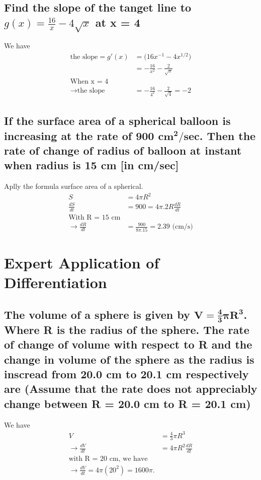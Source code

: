 \documentclass{article}
\begin{document}
\begin{multicols}{2}
\subsection{Find the slope of the tanget line to $g(x)=\frac{16}{x}-4\sqrt{x}$ at x = 4}
We have
\begin{align*}
    \text{the slope} = g'(x) &= \Big(16x^{-1} - 4x^{1/2}\Big) \\
                            &= -\frac{16}{x^2} - \frac{2}{\sqrt{x}} \\
    \text{When x = 4} \\
    \rightarrow \text{the slope} &= -\frac{16}{4^2} - \frac{2}{\sqrt{4}} = -2
\end{align*}


\subsection{If the surface area of a spherical balloon is increasing at the rate of 900 $\mathbf{cm^2/sec}$. Then the rate of change of radius of balloon at instant when radius is 15 cm [in cm/sec]}
Aplly the formula surface area of a spherical.
\begin{align*}
    S &= 4\pi R^2 \\
    \frac{dS}{dt} &= 900 = 4\pi.2R\frac{dR}{dt} \\
    \text{With R = 15 cm} \\
    \rightarrow \frac{dR}{dt} &= \frac{900}{8\pi . 15} = 2.39 \text{ (cm/s)}
\end{align*}

\end{multicols}


\section{Expert Application of Differentiation}

\begin{multicols}{2}
    
\subsection{The volume of a sphere is given by $\mathbf{V = \frac{4}{3}\pi R^3}$. Where R is the radius of the sphere. The rate of change of volume with respect to R and the change in volume of the sphere as the radius 
is inscread from 20.0 cm to 20.1 cm respectively are (Assume that the rate does not appreciably change between R = 20.0 cm to R = 20.1 cm)}
We have
\begin{align*}
    V &= \frac{4}{3}\pi R^3 \\
    \rightarrow \frac{dV}{dt} &= 4\pi R^2 \frac{dR}{dt} \\
    \text{with R = 20 cm, we have} \\
    \rightarrow \frac{dV}{dt} = 4\pi (20^2) = 1600 \pi.
\end{align*}

\end{multicols}
\end{document}
